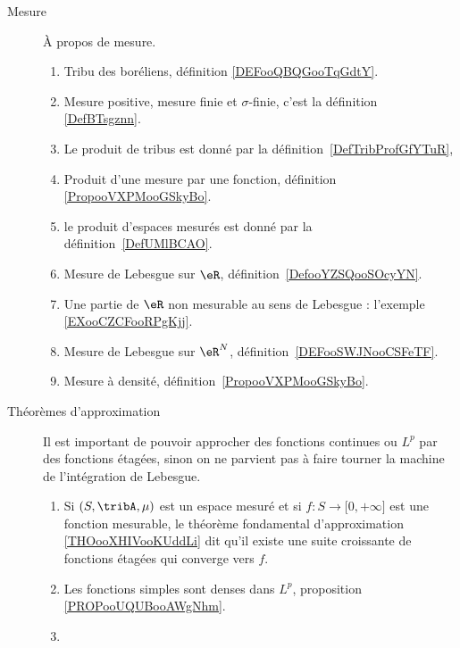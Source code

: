 

       \label{THEMEooKLVRooEqecQk}
\begin{description}
	\item[Mesure]
	      À propos de mesure.
	      \begin{enumerate}
		      \item
		            Tribu des boréliens, définition \ref{DEFooQBQGooTqGdtY}.
		      \item
		            Mesure positive, mesure finie et \( \sigma\)-finie, c'est la définition \ref{DefBTsgznn}.

		      \item Le produit de tribus est donné par la définition~\ref{DefTribProfGfYTuR},     %
		      \item
		            Produit d'une mesure par une fonction, définition \ref{PropooVXPMooGSkyBo}.
		      \item le produit d'espaces mesurés est donné par la définition~\ref{DefUMlBCAO}.     %
		      \item
		            Mesure de Lebesgue sur \( \eR\), définition~\ref{DefooYZSQooSOcyYN}.
		      \item
		            Une partie de \( \eR\) non mesurable au sens de Lebesgue : l'exemple \ref{EXooCZCFooRPgKjj}.
		      \item
		            Mesure de Lebesgue sur \( \eR^N\), définition~\ref{DEFooSWJNooCSFeTF}.
		      \item
		            Mesure à densité, définition~\ref{PropooVXPMooGSkyBo}.
	      \end{enumerate}
	\item[Théorèmes d'approximation]
	      Il est important de pouvoir approcher des fonctions continues ou \( L^p\) par des fonctions étagées, sinon on ne parvient pas à faire tourner la machine de l'intégration de Lebesgue.
	      \begin{enumerate}
		      \item
		            Si \( (S,\tribA, \mu)\) est un espace mesuré et si \( f\colon S\to \mathopen[ 0 , +\infty \mathclose]\) est une fonction mesurable, le théorème fondamental d'approximation \ref{THOooXHIVooKUddLi} dit qu'il existe une suite croissante de fonctions étagées qui converge vers \( f\).
		      \item
		            Les fonctions simples sont denses dans \( L^p\), proposition \ref{PROPooUQUBooAWgNhm}.
		      \item

\end{enumerate}
\end{description}
